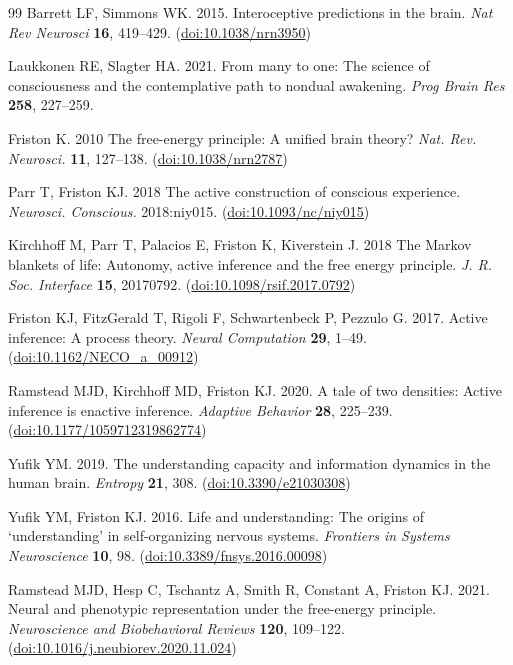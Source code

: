 \documentclass[openacc]{rsproca_new}%
\begin{document}
\begin{thebibliography}{99}
Barrett LF, Simmons WK. 2015. Interoceptive predictions in the brain. \textit{Nat Rev Neurosci} \textbf{16}, 419--429. (\href{https://doi.org/10.1038/nrn3950}{doi:10.1038/nrn3950})

Laukkonen RE, Slagter HA. 2021. From many to one: The science of consciousness and the contemplative path to nondual awakening. \textit{Prog Brain Res} \textbf{258}, 227--259.

Friston K. 2010 The free-energy principle: A unified brain theory?
\textit{Nat. Rev. Neurosci.} \textbf{11}, 127--138. (\href{https://doi.org/10.1038/nrn2787}{doi:10.1038/nrn2787})

Parr T, Friston KJ. 2018 The active construction of conscious experience.
\textit{Neurosci. Conscious.} 2018:niy015. (\href{https://doi.org/10.1093/nc/niy015}{doi:10.1093/nc/niy015})

Kirchhoff M, Parr T, Palacios E, Friston K, Kiverstein J. 2018 The Markov
blankets of life: Autonomy, active inference and the free energy principle.
\textit{J. R. Soc. Interface} \textbf{15}, 20170792.
(\href{https://doi.org/10.1098/rsif.2017.0792}{doi:10.1098/rsif.2017.0792})

Friston KJ, FitzGerald T, Rigoli F, Schwartenbeck P, Pezzulo G. 2017. Active inference: A process theory. \textit{Neural Computation} \textbf{29}, 1--49. (\href{https://doi.org/10.1162/NECO_a_00912}{doi:10.1162/NECO\_a\_00912})

Ramstead MJD, Kirchhoff MD, Friston KJ. 2020. A tale of two densities: Active inference is enactive inference. \textit{Adaptive Behavior} \textbf{28}, 225--239. (\href{https://doi.org/10.1177/1059712319862774}{doi:10.1177/1059712319862774})

Yufik YM. 2019. The understanding capacity and information dynamics in the human brain. \textit{Entropy} \textbf{21}, 308. (\href{https://doi.org/10.3390/e21030308}{doi:10.3390/e21030308})

Yufik YM, Friston KJ. 2016. Life and understanding: The origins of `understanding' in self-organizing nervous systems. \textit{Frontiers in Systems Neuroscience} \textbf{10}, 98. (\href{https://doi.org/10.3389/fnsys.2016.00098}{doi:10.3389/fnsys.2016.00098})

Ramstead MJD, Hesp C, Tschantz A, Smith R, Constant A, Friston KJ. 2021. Neural and phenotypic representation under the free-energy principle. \textit{Neuroscience and Biobehavioral Reviews} \textbf{120}, 109--122. (\href{https://doi.org/10.1016/j.neubiorev.2020.11.024}{doi:10.1016/j.neubiorev.2020.11.024})


\end{thebibliography}
\end{document}
